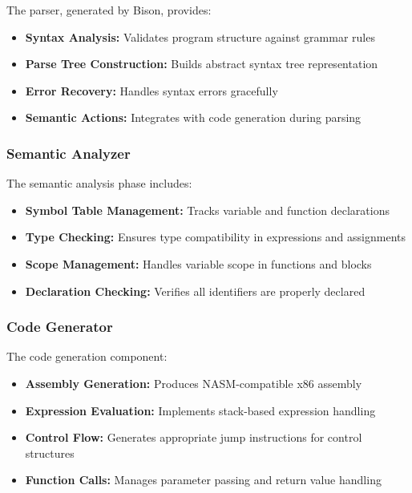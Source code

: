 \documentclass[12pt,a4paper]{article}
\begin{document}
The parser, generated by Bison, provides:

\begin{itemize}
    \item \textbf{Syntax Analysis:} Validates program structure against grammar rules
    \item \textbf{Parse Tree Construction:} Builds abstract syntax tree representation
    \item \textbf{Error Recovery:} Handles syntax errors gracefully
    \item \textbf{Semantic Actions:} Integrates with code generation during parsing
\end{itemize}

\subsubsection{Semantic Analyzer}

The semantic analysis phase includes:

\begin{itemize}
    \item \textbf{Symbol Table Management:} Tracks variable and function declarations
    \item \textbf{Type Checking:} Ensures type compatibility in expressions and assignments
    \item \textbf{Scope Management:} Handles variable scope in functions and blocks
    \item \textbf{Declaration Checking:} Verifies all identifiers are properly declared
\end{itemize}

\subsubsection{Code Generator}

The code generation component:

\begin{itemize}
    \item \textbf{Assembly Generation:} Produces NASM-compatible x86 assembly
    \item \textbf{Expression Evaluation:} Implements stack-based expression handling
    \item \textbf{Control Flow:} Generates appropriate jump instructions for control structures
    \item \textbf{Function Calls:} Manages parameter passing and return value handling
\end{itemize}
\end{document}
